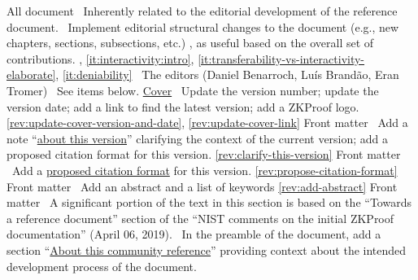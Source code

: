 All document
\newcol \ccontext\ Inherently related to the editorial development of the reference document. 
				\propContrib\ Implement editorial structural changes to the document (e.g., new chapters, 
				sections, subsections, etc.) , as useful based on the overall set of contributions.
\newcol {}, \ref{it:interactivity:intro}, \ref{it:transferability-vs-interactivity-elaborate}, \ref{it:deniability}
\newcol \contributors\ The editors (Daniel Benarroch, Luís Brandão, Eran Tromer)
				\Chan\ See items below.
\newcol 
\rowendL
\hyperref[prelim:cover]{Cover}
\newcol 
\newcol {}
\newcol \Chan\ Update the version number; update the version date; add a link to find the latest version; add a ZKProof logo.
\newcol \ref{rev:update-cover-version-and-date}, \ref{rev:update-cover-link}
\rowendL
Front matter
\newcol 
\newcol {}
\newcol \Chan\ Add a note ``\hyperref[sec:prelim:msg-editors]{about this version}'' clarifying the context of the current version; add a proposed citation format for this version.
\newcol \ref{rev:clarify-this-version}
\rowendL
Front matter
\newcol 
\newcol {}
\newcol \Chan\ Add a \hyperref[how-to-cite-this-version]{proposed citation format} for this version.
\newcol \ref{rev:propose-citation-format}
\rowendL
Front matter
\newcol 
\newcol {}
\newcol \Chan\ Add an abstract and a list of keywords
\newcol \ref{rev:add-abstract}
\rowendL
Front matter
\newcol \ccontext\ A significant portion of the text in this section 
is based on the ``Towards a reference document'' section of the 
``NIST comments on the initial ZKProof documentation'' (April 06, 2019).
\newcol {}
\newcol \Chan\ In the preamble of the document, add a section ``\hyperref[sec:prelim:about-this-community-reference]{About this community reference}'' providing context about the intended development process of the document.
